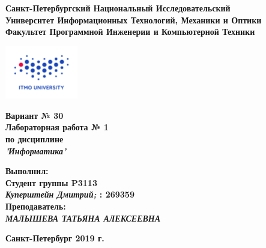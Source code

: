 \documentclass[11pt]{article}
\author{АВТОР}
\date{\today}
\title{}
\begin{document}
\large
\thispagestyle{empty}
\begin{center}
\textbf{Санкт-Петербургский Национальный Исследовательский}\\
\textbf{Университет Информационных Технологий, Механики и Оптики}\\
\textbf{Факультет Программной Инженерии и Компьютерной Техники}\\
\end{center}
\vspace{1em}
\begin{center}
\includegraphics[width=120px]{../../itmo-logo.png}
\end{center}
\LARGE
\vspace{5em}
\begin{center}
\textbf{Вариант № 30}\\
\textbf{Лабораторная работа № 1}\\
\Large
\textbf{по дисциплине}\\
\LARGE
\textbf{\emph{'Информатика'}}\\
\end{center}
\vspace{11em}
\large
\begin{flushright}
\textbf{Выполнил:}\\
\textbf{Студент группы P3113}\\
\textbf{\emph{Куперштейн Дмитрий;} : 269359}\\
\textbf{Преподаватель:}\\
\textbf{\emph{МАЛЫШЕВА ТАТЬЯНА АЛЕКСЕЕВНА}}\\
\end{flushright}
\vspace{4em}
\large
\begin{center}
\textbf{Санкт-Петербург 2019 г.}
\end{center}
\pagebreak{}
\setcounter{tocdepth}{2}
\renewcommand{\contentsname}{Оглавление}
\tableofcontents
\pagebreak{}
\end{document}
